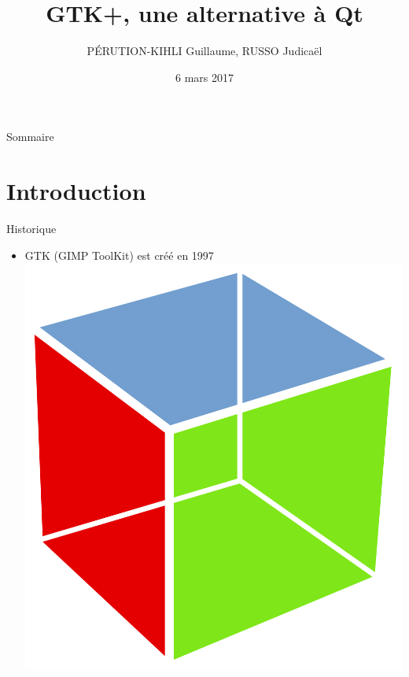 \documentclass{beamer}
\title[]{GTK+, une alternative à Qt}
\author{PÉRUTION-KIHLI Guillaume, RUSSO Judicaël}
\institute[Université de Montpellier]{Université de Montpellier \\ 
\medskip
}
\date{6 mars 2017}
\begin{document}
\maketitle

\begin{frame}{Sommaire}
  \tableofcontents
\end{frame}
\section{Introduction}
\begin{frame}{Historique}
  \begin{itemize}
  	\item GTK (GIMP ToolKit) est créé en 1997 \includegraphics[scale=0.05]{Pictures/GTK.png} 
   \end{itemize}
\end{frame}
\end{document}

